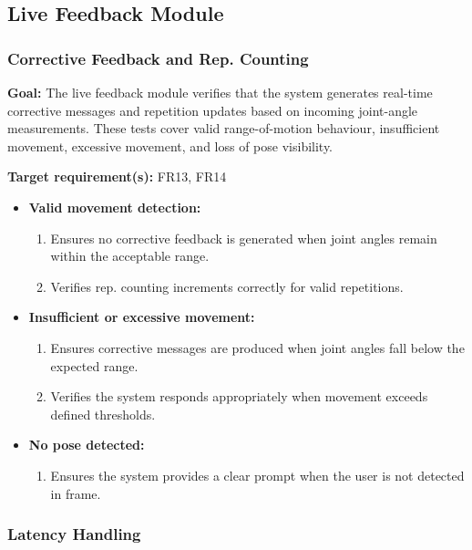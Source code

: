 \documentclass[12pt, titlepage]{article}
\begin{document}
\subsection{Live Feedback Module}

\subsubsection{Corrective Feedback and Rep. Counting}

\textbf{Goal:} The live feedback module verifies that the system generates real-time corrective messages and repetition updates based on incoming joint-angle measurements. These tests cover valid range-of-motion behaviour, insufficient movement, excessive movement, and loss of pose visibility.

\textbf{Target requirement(s):} FR13, FR14

\begin{itemize}
    \item \textbf{Valid movement detection:}
    \begin{enumerate}
        \item Ensures no corrective feedback is generated when joint angles remain within the acceptable range.
        \item Verifies rep. counting increments correctly for valid repetitions.
    \end{enumerate}

    \item \textbf{Insufficient or excessive movement:}
    \begin{enumerate}
        \item Ensures corrective messages are produced when joint angles fall below the expected range.
        \item Verifies the system responds appropriately when movement exceeds defined thresholds.
    \end{enumerate}

    \item \textbf{No pose detected:}
    \begin{enumerate}
        \item Ensures the system provides a clear prompt when the user is not detected in frame.
    \end{enumerate}
\end{itemize}

\subsubsection{Latency Handling}
\end{document}
